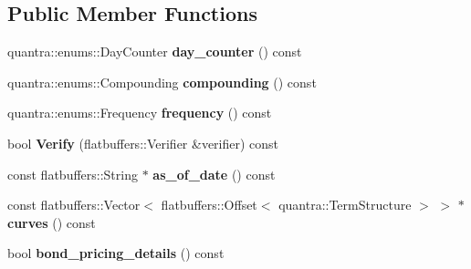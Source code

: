 \subsection*{Public Member Functions}
\begin{DoxyCompactItemize}
\item 
\mbox{\label{structquantra_1_1FLATBUFFERS__FINAL__CLASS_a955b9a33f908db3b82dea98242bc214e}} 
quantra\+::enums\+::\+Day\+Counter {\bfseries day\+\_\+counter} () const
\item 
\mbox{\label{structquantra_1_1FLATBUFFERS__FINAL__CLASS_adba57dc42a842b5f450f4893d7400da1}} 
quantra\+::enums\+::\+Compounding {\bfseries compounding} () const
\item 
\mbox{\label{structquantra_1_1FLATBUFFERS__FINAL__CLASS_a56f742df0ea6d251577d672eb4ae1a00}} 
quantra\+::enums\+::\+Frequency {\bfseries frequency} () const
\item 
\mbox{\label{structquantra_1_1FLATBUFFERS__FINAL__CLASS_aed693ee5a45b5f53af7411f9cab6793a}} 
bool {\bfseries Verify} (flatbuffers\+::\+Verifier \&verifier) const
\item 
\mbox{\label{structquantra_1_1FLATBUFFERS__FINAL__CLASS_a565651032145f0eb99a6f0c9b32d7fd0}} 
const flatbuffers\+::\+String $\ast$ {\bfseries as\+\_\+of\+\_\+date} () const
\item 
\mbox{\label{structquantra_1_1FLATBUFFERS__FINAL__CLASS_a7fa1e6060941ec462337605930e6f065}} 
const flatbuffers\+::\+Vector$<$ flatbuffers\+::\+Offset$<$ quantra\+::\+Term\+Structure $>$ $>$ $\ast$ {\bfseries curves} () const
\item 
\mbox{\label{structquantra_1_1FLATBUFFERS__FINAL__CLASS_a0a1bf5d6d7ca7114682a04f7ea41f7c7}} 
bool {\bfseries bond\+\_\+pricing\+\_\+details} () const
\item 
\mbox{\label{structquantra_1_1FLATBUFFERS__FINAL__CLASS_a5e7cf716a75e4cbc4911c9e6764c9edb}} 

\end{DoxyCompactItemize}
